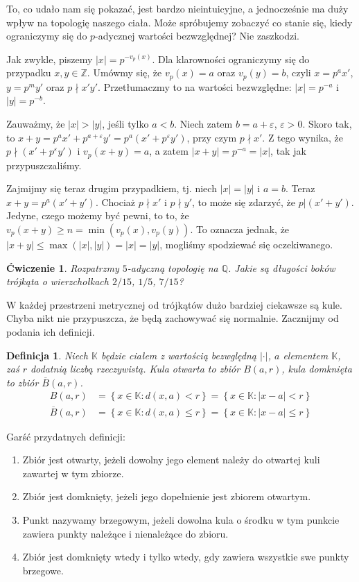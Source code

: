 \documentclass[a4paper,fleqn,9pt]{extarticle}
\newtheorem{prb}[prbh]{\'Cwiczenie}
\newtheorem{dff}{Definicja}
\newenvironment{enumx}{\begin{enumerate}
	\setlength{\itemsep}{0pt}
	\setlength{\parskip}{0pt}
	\setlength{\parsep}{0pt}}
{\end{enumerate}}
\begin{document}
To, co udało nam się pokazać, jest bardzo nieintuicyjne, a jednocześnie ma duży wpływ na topologię naszego ciała.
Może spróbujemy zobaczyć co stanie się, kiedy ograniczymy się do $p$-adycznej wartości bezwzględnej?
Nie zaszkodzi.

Jak zwykle, piszemy $|x| = p^{-v_p(x)}$.
Dla klarowności ograniczymy się do przypadku $x,y\in\mathbb Z$. 
Umówmy się, że $v_p(x) = a$ oraz $v_p(y)= b$, czyli $x = p^a x'$, $y = p^m y'$ oraz $p\nmid x'y'$.
Przetłumaczmy to na wartości bezwzględne: $|x| = p^{-a}$ i $|y| = p^{-b}$. 

Zauważmy, że $|x| > |y|$, jeśli tylko $a < b$.
Niech zatem $b = a + \varepsilon$, $\varepsilon > 0$.
Skoro tak, to $x + y = p^a x' + p^{a + \varepsilon} y' = p ^a \left(x' + p^\varepsilon y'\right)$,
przy czym $p \nmid x'$.
Z tego wynika, że $p \nmid (x' + p^\varepsilon y')$ i $v_p(x+y) = a$, a zatem $|x+y | = p^{-a} = |x|$, tak jak przypuszczaliśmy.

Zajmijmy się teraz drugim przypadkiem, tj. niech $|x| = |y|$ i $a = b$.
Teraz $x+y = p^a(x'+y')$.
Chociaż $p\nmid x'$ i $p \nmid y'$, to może się zdarzyć, że $p | (x'+y')$.
Jedyne, czego możemy być pewni, to to, że $v_p(x+y) \ge n = \min(v_p(x), v_p(y))$.
To oznacza jednak, że $|x+y| \le \max(|x|, |y|) = |x| = |y|$, mogliśmy spodziewać się oczekiwanego.

\begin{prb}
Rozpatrzmy $5$-adyczną topologię na $\mathbb Q$.
Jakie są długości boków trójkąta o wierzchołkach $2/15$, $1/5$, $7/15$?
\end{prb}

W każdej przestrzeni metrycznej od trójkątów dużo bardziej ciekawsze są kule.
Chyba nikt nie przypuszcza, że będą zachowywać się normalnie.
Zacznijmy od podania ich definicji.

\begin{dff}
Niech $\mathbb K$ będzie ciałem z wartością bezwględną $|\cdot|$, $a$ elementem $\mathbb K$, zaś $r$ dodatnią liczbą rzeczywistą. 
Kula otwarta to zbiór $B(a,r)$, kula domknięta to zbiór $\overline{B}(a,r)$.
\begin{align*}
B(a,r) &
 = \left\{x\in\mathbb K: d(x,a) < r \right\}
 = \left\{x\in\mathbb K: |x-a| < r \right\} \\
\overline{B}(a,r) &
 = \left\{x\in\mathbb K: d(x,a) \le r \right\}
 = \left\{x\in\mathbb K: |x-a| \le r \right\}
\end{align*}
\end{dff}

Garść przydatnych definicji:
\begin{enumx}
\item Zbiór jest otwarty, jeżeli dowolny jego element należy do otwartej kuli zawartej w tym zbiorze.
\item Zbiór jest domknięty, jeżeli jego dopełnienie jest zbiorem otwartym.
\item Punkt nazywamy brzegowym, jeżeli dowolna kula o środku w tym punkcie zawiera punkty należące i nienależące do zbioru.
\item Zbiór jest domknięty wtedy i tylko wtedy, gdy zawiera wszystkie swe punkty brzegowe.
\end{enumx}
\end{document}
